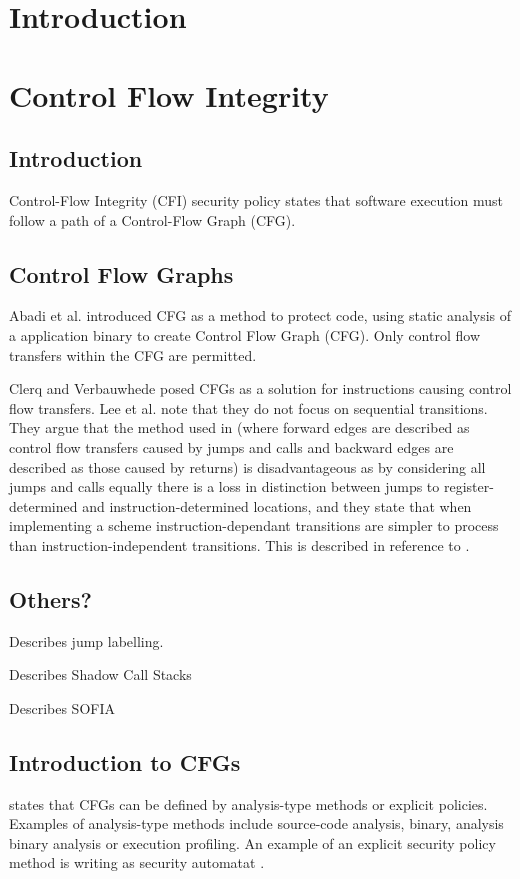 \section{Introduction}
\section{Control Flow Integrity}
\subsection{Introduction}
Control-Flow Integrity (CFI) security policy states that software execution must follow a path of a Control-Flow Graph (CFG).
\subsection{Control Flow Graphs}
Abadi et al. \cite{Abadi2005}introduced CFG as a method to protect code, using static analysis of a application binary to create Control Flow Graph (CFG). Only control flow transfers within the CFG are permitted.

Clerq and Verbauwhede \cite{DeClercq2017} posed CFGs as a solution for instructions causing control flow transfers. Lee et al. \cite{Lee2019} note that they do not focus on sequential transitions. They argue that the method used in \cite{DeClercq2017} (where forward edges are described as control flow transfers caused by jumps and calls and backward edges are described as those caused by returns) is disadvantageous as by considering all jumps and calls equally there is a loss in distinction between jumps to register-determined and instruction-determined locations, and they state that when implementing a scheme instruction-dependant transitions are simpler to process than instruction-independent transitions. This is described in reference to \cite{Lee2016}.
\ifnotesincluded
{}
\fi
\subsection{Others?}
\cite{Abadi2005} Describes jump labelling. 

\cite{DeClercq2017} Describes Shadow Call Stacks

\cite{DeClercq2017a} Describes SOFIA 

\subsection{Introduction to CFGs}
\cite{Abadi2005} states that CFGs can be defined by analysis-type methods or explicit policies. Examples of analysis-type methods include source-code analysis, binary, analysis binary analysis or execution profiling. An example of an explicit security policy method is writing as security automatat \cite{Erlingsson2004}.


